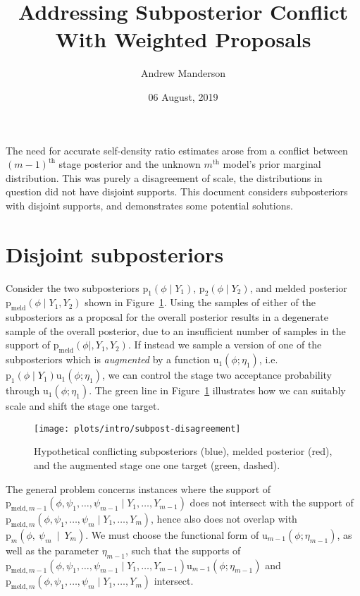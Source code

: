 \documentclass[10pt,a4paper,]{article}
\title{Addressing Subposterior Conflict With Weighted Proposals}
\author{Andrew Manderson}
\date{06 August, 2019}
\newcommand{\pd}{\text{p}}
\newcommand{\pmeld}{\pd_{\text{meld}}}
\newcommand{\tarw}{\text{u}}
\newcommand{\modelindex}{m}
\begin{document}
\maketitle

The need for accurate self-density ratio estimates arose from a conflict
between \((m - 1)^{\text{th}}\) stage posterior and the unknown
\(m^{\text{th}}\) model's prior marginal distribution. This was purely a
disagreement of scale, the distributions in question did not have
disjoint supports. This document considers subposteriors with disjoint
supports, and demonstrates some potential solutions.

\section{Disjoint subposteriors}\label{disjoint-subposteriors}

Consider the two subposteriors \(\pd_{1}(\phi \mid Y_{1})\),
\(\pd_{2}(\phi \mid Y_{2})\), and melded posterior
\(\pmeld(\phi \mid Y_{1}, Y_{2})\) shown in
Figure~\ref{fig:subpost_disagreement}. Using the samples of either of
the subposteriors as a proposal for the overall posterior results in a
degenerate sample of the overall posterior, due to an insufficient
number of samples in the support of \(\pmeld(\phi \mid, Y_{1}, Y_{2})\).
If instead we sample a version of one of the subposteriors which is
\emph{augmented} by a function \(\tarw_{1}(\phi; \eta_{1})\),
i.e.~\(\pd_{1}(\phi \mid Y_{1})\tarw_{1}(\phi; \eta_{1})\), we can
control the stage two acceptance probability through
\(\tarw_{1}(\phi; \eta_{1})\). The green line in
Figure~\ref{fig:subpost_disagreement} illustrates how we can suitably
scale and shift the stage one target.

\begin{figure}

{\centering \texttt{[image: plots/intro/subpost-disagreement]} 

}

\caption{Hypothetical conflicting subposteriors (blue), melded posterior (red), and the augmented stage one one target (green, dashed).}\label{fig:subpost_disagreement}
\end{figure}

The general problem concerns instances where the support of
\(\pd_{\text{meld}, \modelindex - 1}(\phi, \psi_{1}, \ldots, \psi_{\modelindex - 1} \mid Y_{1}, \ldots, Y_{\modelindex - 1})\)
does not intersect with the support of
\(\pd_{\text{meld}, \modelindex}(\phi, \psi_{1}, \ldots, \psi_{\modelindex} \mid Y_{1}, \ldots, Y_{\modelindex})\),
hence also does not overlap with
\(\pd_{\modelindex}(\phi,~\psi_{\modelindex}~\mid~Y_{\modelindex})\). We
must choose the functional form of
\(\tarw_{\modelindex - 1}(\phi; \eta_{\modelindex - 1})\), as well as
the parameter \(\eta_{\modelindex - 1}\), such that the supports of
\(\pd_{\text{meld}, \modelindex - 1}(\phi, \psi_{1}, \ldots, \psi_{\modelindex - 1} \mid Y_{1}, \ldots, Y_{\modelindex - 1})\tarw_{\modelindex - 1}(\phi; \eta_{\modelindex - 1})\)
and
\(\pd_{\text{meld}, \modelindex}(\phi, \psi_{1}, \ldots, \psi_{\modelindex} \mid Y_{1}, \ldots, Y_{\modelindex})\)
intersect.
\end{document}
